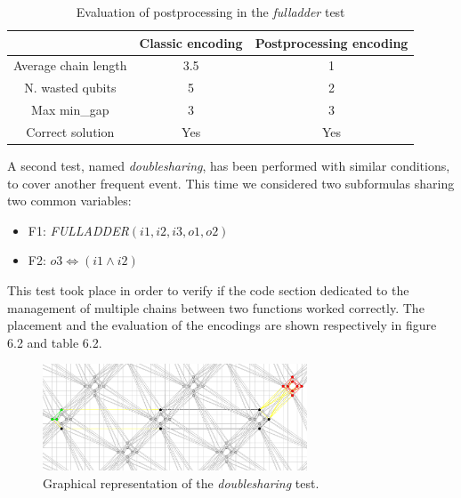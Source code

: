 \begin{table}[]
\centering
\begin{tabular}{|c|c|c|}
\hline
                                             & \cellcolor[HTML]{FFFE65}Classic encoding & \cellcolor[HTML]{FFFE65}Postprocessing encoding \\ \hline
\cellcolor[HTML]{00D2CB}Average chain length & 3.5                                      & 1                                               \\ \hline
\cellcolor[HTML]{00D2CB}N. wasted qubits     & 5                                        & 2                                               \\ \hline
\cellcolor[HTML]{00D2CB}Max min\_gap          & 3                                        & 3                                               \\ \hline
\rowcolor[HTML]{67FD9A} 
\cellcolor[HTML]{00D2CB}Correct solution     & Yes                                      & Yes                                             \\ \hline
\end{tabular}
\caption{Evaluation of postprocessing in the \textit{fulladder} test}
\end{table}

A second test, named \textit{doublesharing}, has been performed with similar conditions, to cover another frequent event. This time we considered two subformulas sharing two common variables:

\begin{itemize}
    \item F1: \textit{FULLADDER}$(i1,i2,i3,o1,o2)$
    \item F2: $o3 \iff (i1 \wedge i2) $
\end{itemize}

This test took place in order to verify if the code section dedicated to the management of multiple chains between two functions worked correctly. The placement and the evaluation of the encodings are shown respectively in figure 6.2 and table 6.2.

\begin{figure}[]
    \centering
    \includegraphics[width=0.7\textwidth]{images/doubleshared.PNG}
    \caption{Graphical representation of the \textit{doublesharing} test.}
    \label{fig:my_label}
\end{figure}


